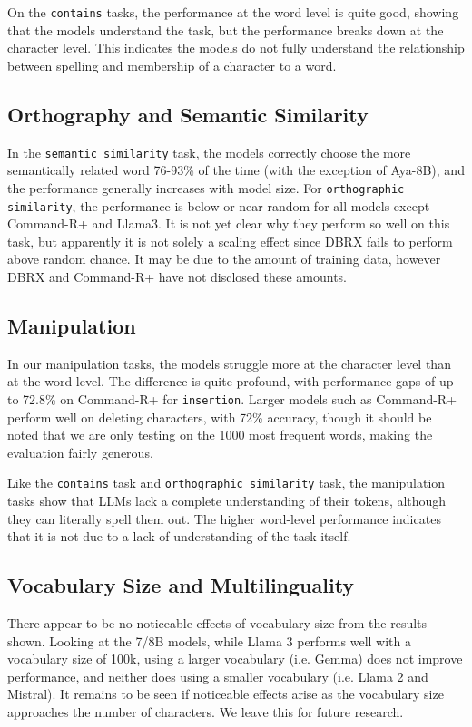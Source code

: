 On the \texttt{contains} tasks, the performance at the word level is quite good, showing that the models understand the task, but the performance breaks down at the character level. This indicates the models do not fully understand the relationship between spelling and membership of a character to a word. 

\subsection{Orthography and Semantic Similarity} In the \texttt{semantic similarity} task, the models correctly choose the more semantically related word 76-93\% of the time (with the exception of Aya-8B), and the performance generally increases with model size. For \texttt{orthographic similarity}, the performance is below or near random for all models except Command-R+ and Llama3. It is not yet clear why they perform so well on this task, but apparently it is not solely a scaling effect since DBRX fails to perform above random chance. It may be due to the amount of training data, however DBRX and Command-R+ have not disclosed these amounts. 

\subsection{Manipulation}
In our manipulation tasks, the models struggle more at the character level than at the word level. The difference is quite profound, with performance gaps of up to 72.8\% on Command-R+ for \texttt{insertion}. Larger models such as Command-R+ perform well on deleting characters, with 72\% accuracy, though it should be noted that we are only testing on the 1000 most frequent words, making the evaluation fairly generous. 

Like the \texttt{contains} task and \texttt{orthographic similarity} task, the manipulation tasks show that LLMs lack a complete understanding of their tokens, although they can literally spell them out. The higher word-level performance indicates that it is not due to a lack of understanding of the task itself. 

\subsection{Vocabulary Size and Multilinguality} There appear to be no noticeable effects of vocabulary size from the results shown. Looking at the 7/8B models, while Llama 3 performs well with a vocabulary size of 100k, using a larger vocabulary (i.e. Gemma) does not improve performance, and neither does using a smaller vocabulary (i.e. Llama 2 and Mistral). It remains to be seen if noticeable effects arise as the vocabulary size approaches the number of characters. We leave this for future research. 

